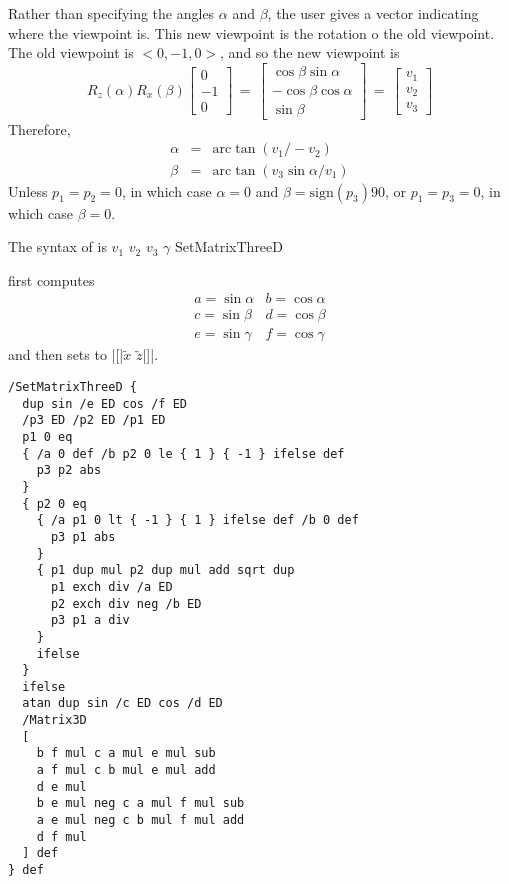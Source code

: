 \documentclass[11pt,english,BCOR10mm,DIV12,bibliography=totoc,parskip=false,smallheadings
    headexclude,footexclude,oneside,dvipsnames,svgnames]{pst-doc}
\def\la{<}
\def\ra{>}
\def\arc{\mathrm{arc}}
\def\sign{\mathrm{sign}}
\begin{document}
 Rather than specifying the angles $\alpha$ and $\beta$, the user gives a
 vector indicating where the viewpoint is. This new viewpoint is the rotation
 o the old viewpoint. The old viewpoint is $\la 0, -1, 0\ra$, and so the new
 viewpoint is
 \[
  R_z(\alpha) R_x(\beta) \left[ \begin{array}{c} 0\\-1\\0 \end{array} \right]
  \, = \,
  \left[ \begin{array}{c}
    \cos\beta \sin\alpha \\
    -\cos\beta \cos\alpha \\
    \sin\beta
  \end{array} \right]
  \, = \,
  \left[ \begin{array}{c} v_1 \\ v_2 \\ v_3 \end{array} \right]
 \]
 Therefore,
 \begin{eqnarray*}
   \alpha & = & \arc\tan (v_1 / -v_2) \\
   \beta & = & \arc\tan (v_3 \sin\alpha / v_1)
 \end{eqnarray*}
 Unless $p_1=p_2=0$, in which case $\alpha=0$ and $\beta=\sign(p_3)90$, or
 $p_1=p_3=0$, in which case $\beta=0$.



The syntax of  is
   $v_1$ $v_2$ $v_3$ $\gamma$ SetMatrixThreeD

 first computes
 \[
   \begin{array}{ll}
     a=\sin\alpha & b=\cos\alpha\\
     c=\sin\beta  & d=\cos\beta\\
     e=\sin\gamma & f=\cos\gamma
   \end{array}
 \]
 and then sets  to |[|$\tilde{x}$ $\tilde{z}$|]|.


\begin{lstlisting}
/SetMatrixThreeD {
  dup sin /e ED cos /f ED
  /p3 ED /p2 ED /p1 ED
  p1 0 eq
  { /a 0 def /b p2 0 le { 1 } { -1 } ifelse def
    p3 p2 abs
  }
  { p2 0 eq
    { /a p1 0 lt { -1 } { 1 } ifelse def /b 0 def
      p3 p1 abs
    }
    { p1 dup mul p2 dup mul add sqrt dup
      p1 exch div /a ED
      p2 exch div neg /b ED
      p3 p1 a div
    }
    ifelse
  }
  ifelse
  atan dup sin /c ED cos /d ED
  /Matrix3D
  [
    b f mul c a mul e mul sub
    a f mul c b mul e mul add
    d e mul
    b e mul neg c a mul f mul sub
    a e mul neg c b mul f mul add
    d f mul
  ] def
} def
\end{lstlisting}
\end{document}
